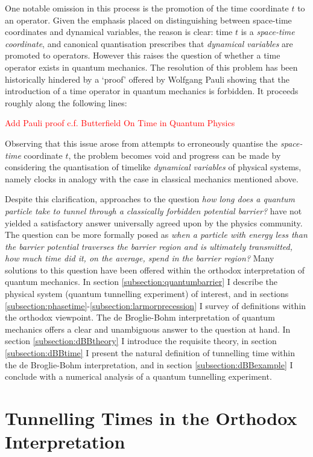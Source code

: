 \documentclass{article}
\begin{document}
One notable omission in this process is the promotion of the time coordinate $t$ to an operator. Given the emphasis placed on distinguishing between space-time coordinates and dynamical variables, the reason is clear: time $t$ is a \textit{space-time coordinate}, and canonical quantisation prescribes that \textit{dynamical variables} are promoted to operators. However this raises the question of whether a time operator exists in quantum mechanics. The resolution of this problem has been historically hindered by a `proof' offered by Wolfgang Pauli showing that the introduction of a time operator in quantum mechanics is forbidden. It proceeds roughly along the following lines:

\textcolor{red}{Add Pauli proof c.f. Butterfield On Time in Quantum Physics}

Observing that this issue arose from attempts to erroneously quantise the \textit{space-time} coordinate $t$, the problem becomes void and progress can be made by considering the quantisation of timelike \textit{dynamical variables} of physical systems, namely clocks in analogy with the case in classical mechanics mentioned above. 

Despite this clarification, approaches to the question \textit{how long does a quantum particle take to tunnel through a classically forbidden potential barrier?} have not yielded a satisfactory answer universally agreed upon by the physics community. The question can be more formally posed as \textit{when a particle with energy less than the barrier potential traverses the barrier region and is ultimately transmitted, how much time did it, on the average, spend in the barrier region?} Many solutions to this question have been offered within the orthodox interpretation of quantum mechanics. In section \ref{subsection:quantumbarrier} I describe the physical system (quantum tunnelling experiment) of interest, and in sections \ref{subsection:phasetime}-\ref{subsection:larmorprecession} I survey of definitions within the orthodox viewpoint. The de Broglie-Bohm interpretation of quantum mechanics offers a clear and unambiguous answer to the question at hand. In section \ref{subsection:dBBtheory} I introduce the requisite theory, in section \ref{subsection:dBBtime} I present the natural definition of tunnelling time within the de Broglie-Bohm interpretation, and in section \ref{subsection:dBBexample} I conclude with a numerical analysis of a quantum tunnelling experiment.

\section{Tunnelling Times in the Orthodox Interpretation}
\label{section:Orthodox}
\end{document}
